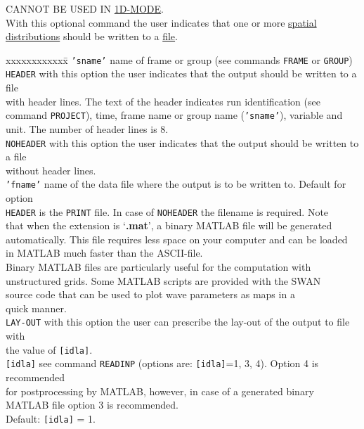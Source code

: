 \documentclass[12pt]{book}
\begin{document}
\noindent
CANNOT BE USED IN \underline{1D-MODE}.
\\[2ex]
With this optional command the user indicates that one or more \underline{spatial
distributions} should be written to a \underline{file}.

\begin{tabbing}
 xxxxxxxxxxxx\= \kill
{\tt {'sname'}} \> name of frame or group (see commands {\tt FRAME} or {\tt GROUP})\\
{\tt HEADER}    \> with this option the user indicates that the output should be written to a file\+\\
                   with header lines. The text of the header indicates run identification (see\\
                   command {\tt PROJECT}), time, frame name or group name ({\tt {'sname'}}), variable and\\
                   unit. The number of header lines is 8.\-\\
{\tt NOHEADER}  \> with this option the user indicates that the output should be written to a file\+\\
                   without header lines.\-\\
{\tt {'fname'}} \> name of the data file where the output is to be written to. Default for option\+\\
                   {\tt HEADER} is the {\tt PRINT} file. In case of {\tt NOHEADER} the filename is required. Note\\
                   that when the extension is `{\bf .mat}', a binary MATLAB file will be generated\\
                   automatically. This file requires less space on your computer and can be loaded\\
                   in MATLAB much faster than the ASCII-file.\\
                   Binary MATLAB files are particularly useful for the computation with\\
                   unstructured grids. Some MATLAB scripts are provided with the SWAN\\
                   source code that can be used to plot wave parameters as maps in a\\
                   quick manner.\-\\
{\tt LAY-OUT}   \> with this option the user can prescribe the lay-out of the output to file with\+\\
                   the value of {\tt [idla]}.\-\\
{\tt [idla]}    \> see command {\tt READINP} (options are: {\tt [idla]}=1, 3, 4). Option 4 is recommended\+\\
                   for postprocessing by MATLAB, however, in case of a generated binary\\
                   MATLAB file option 3 is recommended.\\
                   Default: {\tt [idla]} = 1.\-\\
\end{tabbing}
\end{document}
